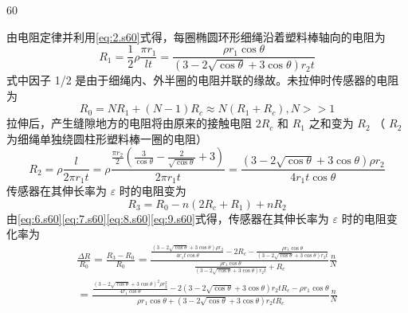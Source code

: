 \begin{solution}{60}
\begin{subsolution}
        由电阻定律并利用\eqref{eq:2.s60}式得，每圈椭圆环形细绳沿着塑料棒轴向的电阻为
        \begin{equation}
            R _ {1} = \frac {1}{2} \rho \frac {\pi r _ {1}}{l t} = \frac {\rho r _ {1} \cos \theta}{(3 - 2 \sqrt {\cos \theta} + 3 \cos \theta) r _ {2} t}
            \label{eq:6.s60}
        \end{equation}
        式中因子 1/2 是由于细绳内、外半圈的电阻并联的缘故。未拉伸时传感器的电阻为
        \begin{equation}
            R _ {0} = N R _ {1} + (N - 1) R _ {c} \approx N (R _ {1} + R _ {c}), N >> 1
            \label{eq:7.s60}
        \end{equation}
        拉伸后，产生缝隙地方的电阻将由原来的接触电阻 $2R_{c}$ 和 $R_{1}$ 之和变为 $R_{2}$ （ $R_{2}$ 为细绳单独绕圆柱形塑料棒一圈的电阻）
        \begin{equation}
            R _ {2} = \rho \frac {l}{2 \pi r _ {1} t} = \rho \frac {\frac {\pi r _ {2}}{2} \left(\frac {3}{\cos \theta} - \frac {2}{\sqrt {\cos \theta}} + 3\right)}{2 \pi r _ {1} t} = \frac {(3 - 2 \sqrt {\cos \theta} + 3 \cos \theta) \rho r _ {2}}{4 r _ {1} t \cos \theta}
            \label{eq:8.s60}
        \end{equation}
        传感器在其伸长率为 $\varepsilon$ 时的电阻变为
        \begin{equation}
            R _ {3} = R _ {0} - n (2 R _ {c} + R _ {1}) + n R _ {2}
            \label{eq:9.s60}
        \end{equation}
        由\eqref{eq:6.s60}\eqref{eq:7.s60}\eqref{eq:8.s60}\eqref{eq:9.s60}式得，传感器在其伸长率为 $\varepsilon$ 时的电阻变化率为
        \begin{equation}
            \begin{array}{l}
                \frac {\Delta R}{R _ {0}} = \frac {R _ {3} - R _ {0}}{R _ {0}} = \frac {\frac {(3 - 2 \sqrt {\cos \theta} + 3 \cos \theta) \rho r _ {2}}{4 r _ {1} t \cos \theta} - 2 R _ {c} - \frac {\rho r _ {1} \cos \theta}{(3 - 2 \sqrt {\cos \theta} + 3 \cos \theta) r _ {2} t}}{\frac {\rho r _ {1} \cos \theta}{(3 - 2 \sqrt {\cos \theta} + 3 \cos \theta) r _ {2} t} + R _ {c}} \frac {n}{N} \\
                = \frac {\frac {(3 - 2 \sqrt {\cos \theta} + 3 \cos \theta)^{2} \rho r _ {2}^{2}}{4 r _ {1} \cos \theta} - 2 (3 - 2 \sqrt {\cos \theta} + 3 \cos \theta) r _ {2} t R _ {c} - \rho r _ {1} \cos \theta}{\rho r _ {1} \cos \theta + (3 - 2 \sqrt {\cos \theta} + 3 \cos \theta) r _ {2} t R _ {c}} \frac {n}{N} \\

\end{array}
\end{equation}
\end{subsolution}
\end{solution}
